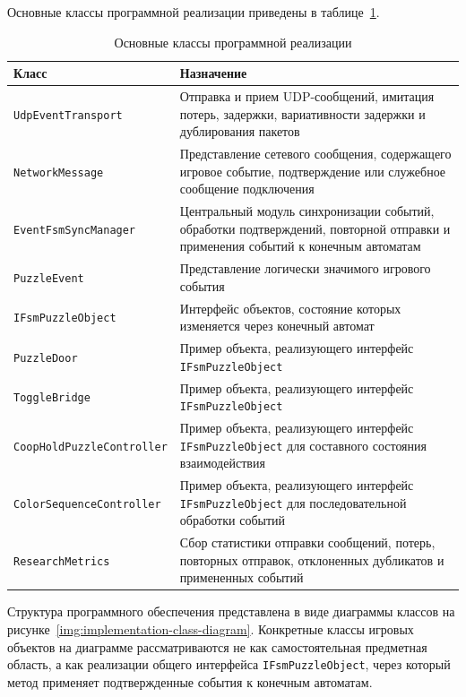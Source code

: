 Основные классы программной реализации приведены в таблице~\ref{tab:implementation-modules}.

\begin{table}[H]
	\caption{Основные классы программной реализации}
	\label{tab:implementation-modules}
	\centering
	\small
	\renewcommand{\arraystretch}{1.2}
	\begin{tabular}{|p{6.2cm}|p{7.8cm}|}
		\hline
		Класс & Назначение \\ \hline
		\texttt{UdpEventTransport} & Отправка и прием UDP-сообщений, имитация потерь, задержки, вариативности задержки и дублирования пакетов \\ \hline
		\texttt{NetworkMessage} & Представление сетевого сообщения, содержащего игровое событие, подтверждение или служебное сообщение подключения \\ \hline
		\texttt{EventFsmSyncManager} & Центральный модуль синхронизации событий, обработки подтверждений, повторной отправки и применения событий к конечным автоматам \\ \hline
		\texttt{PuzzleEvent} & Представление логически значимого игрового события \\ \hline
		\texttt{IFsmPuzzleObject} & Интерфейс объектов, состояние которых изменяется через конечный автомат \\ \hline
		\texttt{PuzzleDoor} & Пример объекта, реализующего интерфейс \texttt{IFsmPuzzleObject} \\ \hline
		\texttt{ToggleBridge} & Пример объекта, реализующего интерфейс \texttt{IFsmPuzzleObject} \\ \hline
		\texttt{CoopHoldPuzzleController} & Пример объекта, реализующего интерфейс \texttt{IFsmPuzzleObject} для составного состояния взаимодействия \\ \hline
		\texttt{ColorSequenceController} & Пример объекта, реализующего интерфейс \texttt{IFsmPuzzleObject} для последовательной обработки событий \\ \hline
		\texttt{ResearchMetrics} & Сбор статистики отправки сообщений, потерь, повторных отправок, отклоненных дубликатов и примененных событий \\ \hline
	\end{tabular}
\end{table}


Структура программного обеспечения представлена в виде диаграммы классов на рисунке~\ref{img:implementation-class-diagram}. Конкретные классы игровых объектов на диаграмме рассматриваются не как самостоятельная предметная область, а как реализации общего интерфейса \texttt{IFsmPuzzleObject}, через который метод применяет подтвержденные события к конечным автоматам.

